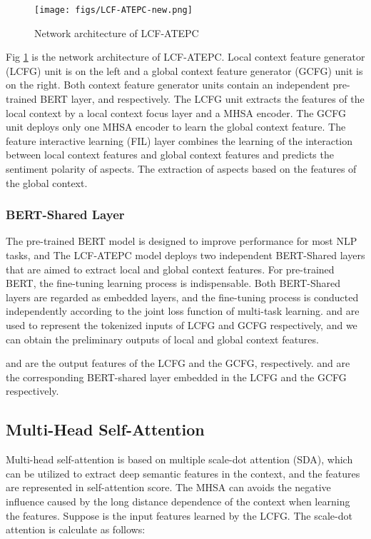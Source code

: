 \documentclass[a4paper,fleqn]{cas-sc}
\begin{document}
\begin{figure}
	\centering
	\texttt{[image: figs/LCF-ATEPC-new.png]}
	\caption{Network architecture of LCF-ATEPC}
	\label{fig:lcf-atepc}
\end{figure}

Fig \ref{fig:lcf-atepc} is the network architecture of LCF-ATEPC. 
Local context feature generator (LCFG) unit is on the left and a global context feature generator (GCFG) unit is on the right. Both context feature generator units contain an independent pre-trained BERT layer,  and  respectively. The LCFG unit extracts the features of the local context by a local context focus layer and a MHSA encoder. The GCFG unit deploys only one MHSA encoder to learn the global context feature. The feature interactive learning (FIL) layer combines the learning of the interaction between local context features and global context features and predicts the sentiment polarity of aspects. The extraction of aspects based on the features of the global context. 

\subsubsection{BERT-Shared Layer}

The pre-trained BERT model is designed to improve performance for most NLP tasks, and The LCF-ATEPC model deploys two independent BERT-Shared layers that are aimed to extract local and global context features. 
For pre-trained BERT, the fine-tuning learning process is indispensable. Both BERT-Shared layers are regarded as embedded layers, and the fine-tuning process is conducted independently according to the joint loss function of multi-task learning.
 and  are used to represent the tokenized inputs of LCFG and GCFG respectively, and we can obtain the preliminary outputs of local and global context features.



 and  are the output features of the LCFG and the GCFG, respectively.  and  are the corresponding BERT-shared layer embedded in the LCFG and the GCFG respectively.

\subsection{Multi-Head Self-Attention}

Multi-head self-attention is based on multiple scale-dot attention (SDA), which can be utilized to extract deep semantic features in the context, and the features are represented in self-attention score. The MHSA can avoids the negative influence caused by the long distance dependence of the context when learning the features.
Suppose  is the input features learned by the LCFG. The scale-dot attention is calculate as follows:
\end{document}
